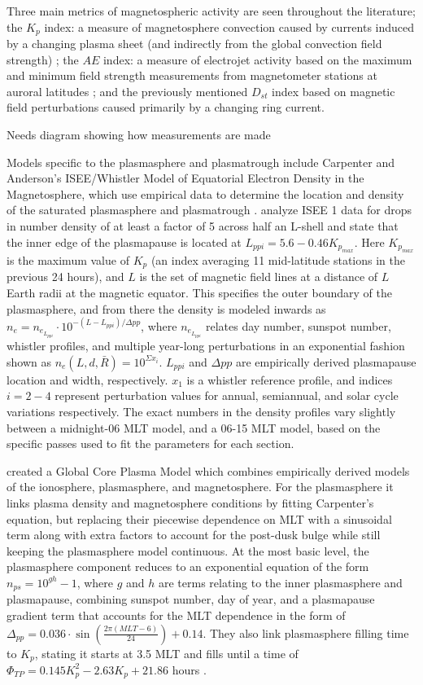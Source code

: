 Three main metrics of magnetospheric activity are seen throughout the literature; the $K_p$ index: a measure of magnetosphere convection caused by currents induced by a changing plasma sheet (and indirectly from the global convection field strength) \citep{Thomsen2004WhyKpSoGood}; the $AE$ index: a measure of electrojet activity based on the maximum and minimum field strength measurements from magnetometer stations at auroral latitudes \citep{DavisSugiura1966AE}; and the previously mentioned $D_{st}$ index based on magnetic field perturbations caused primarily by a changing ring current.

\note Needs diagram showing how measurements are made

Models specific to the plasmasphere and plasmatrough include Carpenter and Anderson's ISEE/Whistler Model of Equatorial Electron Density in the Magnetosphere, which use empirical data to determine the location and density of the saturated plasmasphere and plasmatrough \citep{Carpenter1992ISEEModel}. \cite{Carpenter1992ISEEModel} analyze ISEE 1 data for drops in number density of at least a factor of 5 across half an L-shell and state that the inner edge of the plasmapause is located at $L_{ppi}=5.6-0.46K_{p_{max}}$. Here $K_{p_{max}}$ is the maximum value of $K_p$ (an index averaging 11 mid-latitude stations in the previous 24 hours), and $L$ is the set of magnetic field lines at a distance of $L$ Earth radii at the magnetic equator. This specifies the outer boundary of the plasmasphere, and from there the density is modeled inwards as $n_e=n_{e_{L_{ppi}}}\cdot 10^{-(L-L_{ppi})/\Delta pp}$, where $n_{e_{L_{ppi}}}$ relates day number, sunspot number, whistler profiles, and multiple year-long perturbations in an exponential fashion shown as $n_e(L,d,\bar{R})=10^{\Sigma x_i}$. $L_{ppi}$ and $\Delta pp$ are empirically derived plasmapause location and width, respectively. $x_1$ is a whistler reference profile, and indices $i=2-4$ represent perturbation values for annual, semiannual, and solar cycle variations respectively. The exact numbers in the density profiles vary slightly between a midnight-06 MLT model, and a 06-15 MLT model, based on the specific passes used to fit the parameters for each section. 

\cite{Gallagher2000GlobalCore} created a Global Core Plasma Model which combines empirically derived models of the ionosphere, plasmasphere, and magnetosphere. For the plasmasphere it links plasma density and magnetosphere conditions by fitting Carpenter's equation, but replacing their piecewise dependence on MLT with a sinusoidal term along with extra factors to account for the post-dusk bulge while still keeping the plasmasphere model continuous. At the most basic level, the plasmasphere component reduces to an exponential equation of the form $n_{ps}=10^{gh}-1$, where $g$ and $h$ are terms relating to the inner plasmasphere and plasmapause, combining sunspot number, day of year, and a plasmapause gradient term that accounts for the MLT dependence in the form of $\Delta_{pp}=0.036\cdot \sin(\frac{2\pi (MLT-6)}{24})+0.14$. They also link plasmasphere filling time to $K_p$, stating it starts at 3.5 MLT and fills until a time of $\Phi_{TP}=0.145K_p^2-2.63K_p+21.86$ hours \citep{Gallagher1995AzimuthalVariation}.

